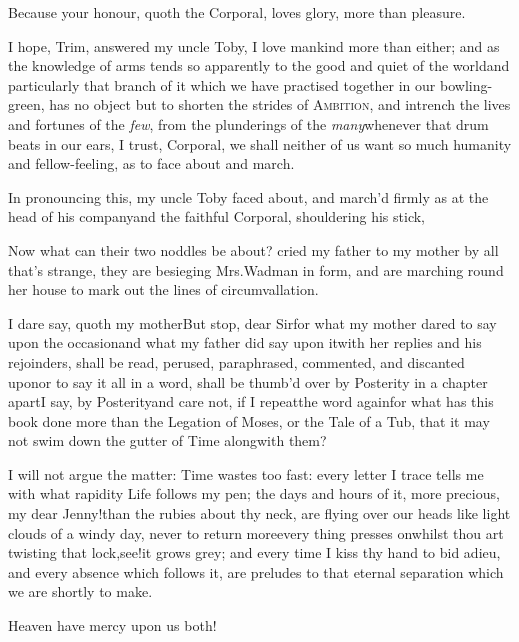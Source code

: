 \documentclass{article}
\begin{document}
\tsh Because your honour, quoth the Corporal, loves
glory, more than pleasure.

I hope, Trim, answered my uncle Toby, I love mankind more than either; and as the
knowledge of arms tends so apparently to the good and quiet of the world\tsh and
particularly that branch of it which we have practised together in our
bowling-green, has no object but to shorten the strides of \textsc{Ambition}, and
intrench the lives and fortunes of the \textit{few}, from the plunderings of the
\textit{many}\break\tsh whenever that drum beats in our ears, I trust, Corporal, we shall
neither of us want so much humanity and fellow-feeling, as to face about and march.

In pronouncing this, my uncle Toby faced about, and march’d firmly as at the head of
his company\tsh and the faithful Corporal, shouldering his stick,

\tsh Now what can their two noddles be about? cried my father to my mother\break
\null\tsh by all that’s strange, they are besieging Mrs.\@ Wadman in form, and are
marching round her house to mark out the lines of circumvallation.

I dare say, quoth my mother\tsh\break\tsk But stop, dear Sir\tsk for what my
mother dared to say upon the occasion\break\tsh and what my father did say upon
it\tsh with her replies and his rejoinders, shall be read, perused, paraphrased,
commented, and discanted upon\tsk or to say it all in a word, shall be thumb’d
over by Posterity in a chapter apart\tsh I say, by Posterity\tsk and care not, if
I repeat\break the word again\tsk for what has this book done more than the Legation of
Moses, or the Tale of a Tub, that it may not swim down the gutter of Time
along\break with them?

I will not argue the matter: Time wastes too fast: every letter I trace tells me
with what rapidity Life follows my pen; the days and hours of it, more precious, my
dear Jenny!\@ than the rubies about thy neck, are flying over our heads like light
clouds of a windy day, never to return more\tsh every thing presses on\tsh whilst
thou art twisting that lock,\tsh see!\@ it grows grey; and every time I kiss thy
hand to bid adieu, and every absence which follows it, are preludes to that eternal
separation which we are shortly to make.\tsh

\tsh Heaven have mercy upon us both!
\end{document}
